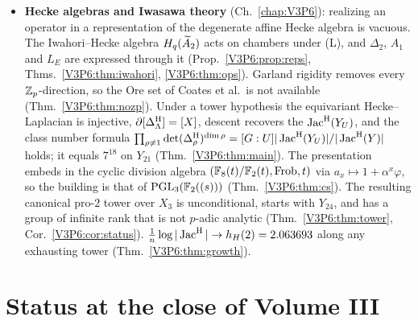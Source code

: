 \begin{itemize}
(Thm.~\ref{V3P5:thm:cluster}, Prop.~\ref{V3P5:prop:Y21}). In Monte Carlo runs thick complexes
behave like random regular graphs, while the thin lattice favours cooperation
(Rem.~\ref{V3P5:rem:mc}). Cyclic replicator dynamics has no limit cycle and no torus, and
mutation produces a Hopf cycle at $\mu_H=(b-a)/18$ (Thms.~\ref{V3P5:thm:rps},
\ref{V3P5:thm:mutation}).
\item \textbf{Hecke algebras and Iwasawa theory} (Ch.~\ref{chap:V3P6}): realizing an operator
in a representation of the degenerate affine Hecke algebra is vacuous. The Iwahori--Hecke
algebra $H_q(\widetilde A_2)$ acts on chambers under (L), and $\Delta_2$, $A_1$ and $L_E$ are expressed
through it (Prop.~\ref{V3P6:prop:reps}, Thms.~\ref{V3P6:thm:iwahori}, \ref{V3P6:thm:ops}).
Garland rigidity removes every $\mathbb{Z}_p$-direction, so the Ore set of Coates et al.\ is not
available (Thm.~\ref{V3P6:thm:nozp}). Under a tower hypothesis the equivariant Hecke--Laplacian
is injective, $\partial[\Delta^{\mathrm{H}}_\Lambda]=[X]$, descent recovers the $\operatorname{Jac}^{\mathrm{H}}(Y_U)$, and the class
number formula $\prod_{\rho\ne1}\det(\Delta^{\mathrm{H}}_\rho)^{\dim\rho}=[G:U]|\operatorname{Jac}^{\mathrm{H}}(Y_U)|/|\operatorname{Jac}^{\mathrm{H}}(Y)|$ holds;
it equals $7^{18}$ on $Y_{21}$ (Thm.~\ref{V3P6:thm:main}). The presentation embeds in the cyclic division algebra $(\mathbb{F}_8(t)/\mathbb{F}_2(t),\mathrm{Frob},t)$ via $a_x\mapsto1+\alpha^{x}\varphi$, so the building is that of $\mathrm{PGL}_3(\mathbb{F}_2((s)))$ (Thm.~\ref{V3P6:thm:cs}). The resulting canonical pro-$2$ tower over $X_3$ is unconditional, starts with $Y_{24}$, and has a group of infinite rank that is not $p$-adic analytic (Thm.~\ref{V3P6:thm:tower}, Cor.~\ref{V3P6:cor:status}). $\frac1n\log|\operatorname{Jac}^{\mathrm{H}}|\to h_H(2)=2.063693$ along any exhausting tower (Thm.~\ref{V3P6:thm:growth}).


\end{itemize}

\section*{Status at the close of Volume III}

